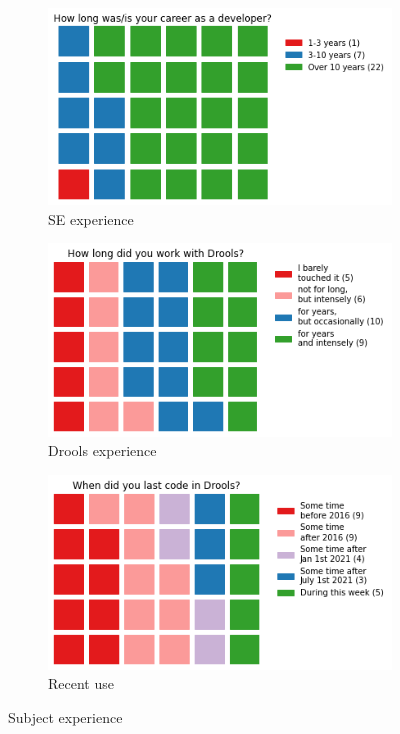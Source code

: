 \begin{figure}[H]
    \begin{subfigure}{.33\textwidth}
      \centering
      \includegraphics[width=.95\linewidth]{Sections/images/pie_experiencer2.png}
      \caption{SE experience}
      \label{fig:sfig1}
    \end{subfigure}%
    \begin{subfigure}{.33\textwidth}
      \centering
      \includegraphics[width=.95\linewidth]{Sections/images/pie_droolsExperience2.png}
      \caption{Drools experience}
      \label{fig:sfig2}
    \end{subfigure}
    \begin{subfigure}{.33\textwidth}
        \centering
        \includegraphics[width=.95\linewidth]{Sections/images/pie_recentusage2.png}
        \caption{Recent use}
        \label{fig:sfig3}
      \end{subfigure}
    \caption{Subject experience}
    \label{fig:subject_experience}
\end{figure}

